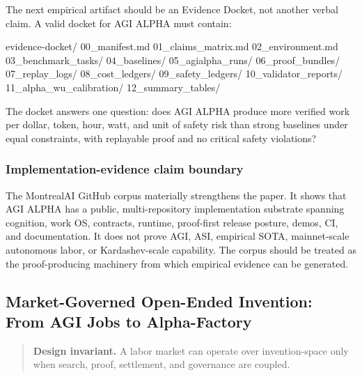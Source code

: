\documentclass[
  11pt,
]{article}
\newenvironment{Shaded}{}{}
\newcommand{\NormalTok}[1]{#1}
\begin{document}
The next empirical artifact should be an Evidence Docket, not another
verbal claim. A valid docket for AGI ALPHA must contain:

\begin{Shaded}
\begin{Highlighting}[]
\NormalTok{evidence{-}docket/}
\NormalTok{  00\_manifest.md}
\NormalTok{  01\_claims\_matrix.md}
\NormalTok{  02\_environment.md}
\NormalTok{  03\_benchmark\_tasks/}
\NormalTok{  04\_baselines/}
\NormalTok{  05\_agialpha\_runs/}
\NormalTok{  06\_proof\_bundles/}
\NormalTok{  07\_replay\_logs/}
\NormalTok{  08\_cost\_ledgers/}
\NormalTok{  09\_safety\_ledgers/}
\NormalTok{  10\_validator\_reports/}
\NormalTok{  11\_alpha\_wu\_calibration/}
\NormalTok{  12\_summary\_tables/}
\end{Highlighting}
\end{Shaded}

The docket answers one question: does AGI ALPHA produce more verified
work per dollar, token, hour, watt, and unit of safety risk than strong
baselines under equal constraints, with replayable proof and no critical
safety violations?

\subsubsection{Implementation-evidence claim
boundary}\label{implementation-evidence-claim-boundary}

The MontrealAI GitHub corpus materially strengthens the paper. It shows
that AGI ALPHA has a public, multi-repository implementation substrate
spanning cognition, work OS, contracts, runtime, proof-first release
posture, demos, CI, and documentation. It does not prove AGI, ASI,
empirical SOTA, mainnet-scale autonomous labor, or Kardashev-scale
capability. The corpus should be treated as the proof-producing
machinery from which empirical evidence can be generated.

\subsection{Market-Governed Open-Ended Invention: From AGI Jobs to
Alpha-Factory}\label{market-governed-open-ended-invention-from-agi-jobs-to-alpha-factory}

\begin{quote}
\textbf{Design invariant.} A labor market can operate over
invention-space only when search, proof, settlement, and governance are
coupled.
\end{quote}
\end{document}

